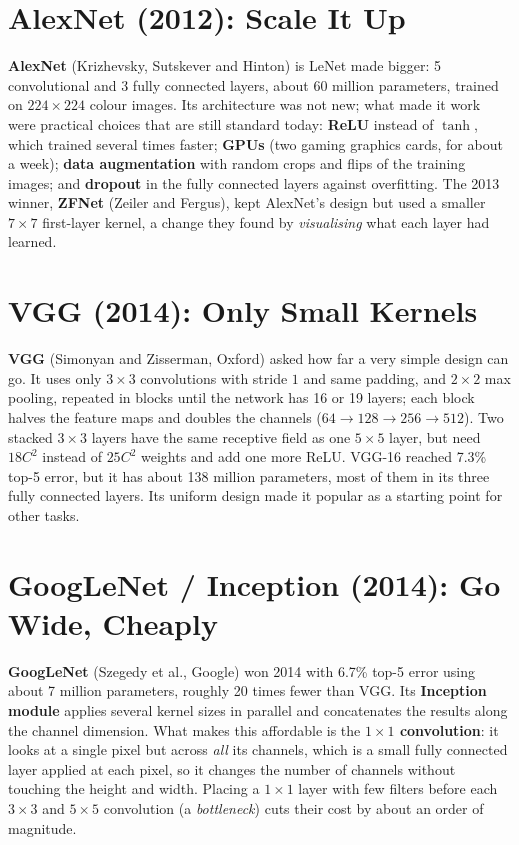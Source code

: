 \documentclass[12pt, a4paper]{article}
\begin{document}
\section{AlexNet (2012): Scale It Up}

\textbf{AlexNet} (Krizhevsky, Sutskever and Hinton) is LeNet made bigger:
5 convolutional and 3 fully connected layers, about 60 million parameters,
trained on $224 \times 224$ colour images. Its architecture was not new; what
made it work were practical choices that are still standard today:
\textbf{ReLU} instead of $\tanh$, which trained several times faster;
\textbf{GPUs} (two gaming graphics cards, for about a week);
\textbf{data augmentation} with random crops and flips of the training images;
and \textbf{dropout} in the fully connected layers against overfitting. The
2013 winner, \textbf{ZFNet} (Zeiler and Fergus), kept AlexNet's design but
used a smaller $7 \times 7$ first-layer kernel, a change they found by
\emph{visualising} what each layer had learned.

\section{VGG (2014): Only Small Kernels}

\textbf{VGG} (Simonyan and Zisserman, Oxford) asked how far a very simple
design can go. It uses only $3 \times 3$ convolutions with stride $1$ and same
padding, and $2 \times 2$ max pooling, repeated in blocks until the network has
16 or 19 layers; each block halves the feature maps and doubles the channels
($64 \to 128 \to 256 \to 512$). Two stacked $3 \times 3$ layers have the same
receptive field as one $5 \times 5$ layer, but need $18C^2$ instead of $25C^2$
weights and add one more ReLU. VGG-16 reached 7.3\% top-5 error, but it has
about 138 million parameters, most of them in its three fully connected
layers. Its uniform design made it popular as a starting point for other
tasks.

\section{GoogLeNet / Inception (2014): Go Wide, Cheaply}

\textbf{GoogLeNet} (Szegedy et al., Google) won 2014 with 6.7\% top-5 error
using about 7 million parameters, roughly 20 times fewer than VGG. Its
\textbf{Inception module} applies several kernel sizes in parallel and
concatenates the results along the channel dimension. What makes this
affordable is the \textbf{$1 \times 1$ convolution}: it looks at a single pixel
but across \emph{all} its channels, which is a small fully connected layer
applied at each pixel, so it changes the number of channels without touching
the height and width. Placing a $1\times1$ layer with few filters before each
$3\times3$ and $5\times5$ convolution (a \emph{bottleneck}) cuts their cost by
about an order of magnitude.
\end{document}
